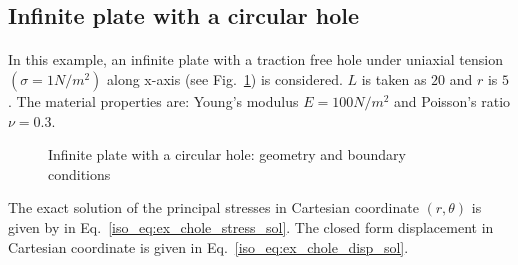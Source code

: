 \subsection{Infinite plate with a circular hole}
\paragraph{}
In this example, an infinite plate with a traction free hole under uniaxial tension $(\sigma = 1 N/m^2 )$ along x-axis (see Fig.~\ref{qdt_fig:ex_chole_geo_bc}) is considered.
$L$ is taken as $20$ and $r$ is $5$.
The material properties are: Young’s modulus $E = 100 N/m^2$ and Poisson’s ratio $\nu = 0.3$.
    \begin{figure}[H]
        \centering
        \caption{ Infinite plate with a circular hole: geometry and boundary conditions}
        \label{qdt_fig:ex_chole_geo_bc}
    \end{figure}
%
The exact solution of the principal stresses in Cartesian coordinate $(r,\theta)$ is given by \cite{Sukumar2001} in Eq.~\ref{iso_eq:ex_chole_stress_sol}.
The closed form displacement in Cartesian coordinate is given in Eq.~\ref{iso_eq:ex_chole_disp_sol}.
